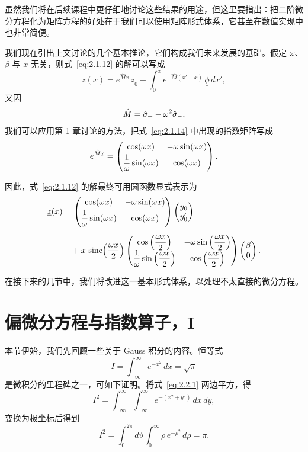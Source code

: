 虽然我们将在后续课程中更仔细地讨论这些结果的用途，但这里要指出：把二阶微分方程化为矩阵方程的好处在于我们可以使用矩阵形式体系，它甚至在数值实现中也非常简便。

我们现在引出上文讨论的几个基本推论，它们构成我们未来发展的基础。假定 $\omega$、$\beta$ 与 $x$ 无关，则式~\eqref{eq:2.1.12} 的解可以写成
\begin{equation}
\underline{z}(x)=e^{\hat{M}x}\,\underline{z}_{0}
+\int_{0}^{x}e^{-\hat{M}(x'-x)}\,\underline{\phi}\,dx',
\label{eq:2.1.14}
\end{equation}
又因
\begin{equation}
\hat{M}=\hat{\sigma}_{+}-\omega^{2}\hat{\sigma}_{-},
\label{eq:2.1.15}
\end{equation}
我们可以应用第 1 章讨论的方法，把式~\eqref{eq:2.1.14} 中出现的指数矩阵写成
\begin{equation}
e^{\hat{M}x}=
\begin{pmatrix}\cos(\omega x)&-\omega\sin(\omega x)\\[1mm]
\dfrac{1}{\omega}\sin(\omega x)&\cos(\omega x)\end{pmatrix}.
\label{eq:2.1.16}
\end{equation}

因此，式~\eqref{eq:2.1.12} 的解最终可用圆函数显式表示为
\begin{align}
\underline{z}(x)&=
\begin{pmatrix}\cos(\omega x)&-\omega\sin(\omega x)\\[1mm]
\dfrac{1}{\omega}\sin(\omega x)&\cos(\omega x)\end{pmatrix}
\begin{pmatrix}y_{0}\\y_{0}'\end{pmatrix}\notag\\[2mm]
&\quad+x\,\operatorname{sinc}\!\left(\frac{\omega x}{2}\right)
\begin{pmatrix}\cos\left(\dfrac{\omega x}{2}\right)&-\omega\sin\left(\dfrac{\omega x}{2}\right)\\[1mm]
\dfrac{1}{\omega}\sin\left(\dfrac{\omega x}{2}\right)&\cos\left(\dfrac{\omega x}{2}\right)\end{pmatrix}
\begin{pmatrix}\beta\\0\end{pmatrix}.
\label{eq:2.1.17}
\end{align}

在接下来的几节中，我们将改进这一基本形式体系，以处理不太直接的微分方程。

\section{偏微分方程与指数算子，I}

本节伊始，我们先回顾一些关于 Gauss 积分的内容。恒等式
\begin{equation}
I=\int_{-\infty}^{\infty}e^{-x^{2}}\,dx=\sqrt{\pi}
\label{eq:2.2.1}
\end{equation}
是微积分的里程碑之一，可如下证明。将式~\eqref{eq:2.2.1} 两边平方，得
\begin{equation}
I^{2}=\int_{-\infty}^{\infty}\int_{-\infty}^{\infty}
e^{-(x^{2}+y^{2})}\,dx\,dy,
\label{eq:2.2.2}
\end{equation}
变换为极坐标后得到
\begin{equation}
I^{2}=\int_{0}^{2\pi}d\vartheta\int_{0}^{\infty}\rho\,e^{-\rho^{2}}\,d\rho=\pi.
\label{eq:2.2.3}
\end{equation}

